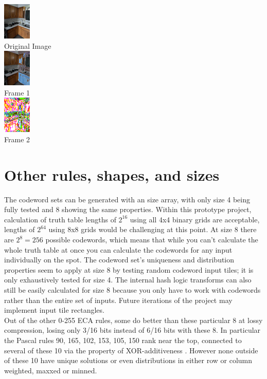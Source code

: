 \documentclass[11pt]{article}
\begin{document}
\begin{center}
\includegraphics{kitchenShrunkresized}\\
Original Image\\
\includegraphics{kitchenShrunkframes0}\\
Frame 1\\
\includegraphics{kitchenShrunkframes1}\\
Frame 2\\
\end{center}

\section{Other rules, shapes, and sizes}

The codeword sets can be generated with an size array, with only size 4 being fully tested and 8 showing the same properties. Within this prototype project, calculation of truth table lengths of $2^{16}$ using all 4x4 binary grids are acceptable, lengths of $2^{64}$ using 8x8 grids would be challenging at this point. At size 8 there are $2^8=256$ possible codewords, which means that while you can't calculate the whole truth table at once you can calculate the codewords for any input individually on the spot. The codeword set's uniqueness and distribution properties seem to apply at size 8 by testing random codeword input tiles; it is only exhaustively tested for size 4. The internal hash logic transforms can also still be easily calculated for size 8 because you only have to work with codewords rather than the entire set of inputs. Future iterations of the project may implement input tile rectangles.\\

Out of the other 0-255 ECA rules, some do better than these particular 8 at lossy compression, losing only 3/16 bits instead of 6/16 bits with these 8. In particular the Pascal rules 90, 165, 102, 153, 105, 150 rank near the top, connected to several of these 10 via the property of XOR-additiveness \cite{xorAdditive}. However none outside of these 10 have unique solutions or even distributions in either row or column weighted, maxxed or minned.\\
\end{document}
